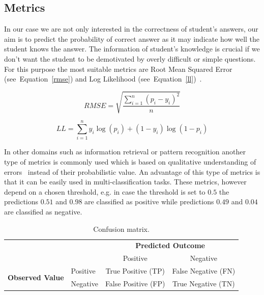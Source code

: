 \subsection{Metrics}

In our case we are not only interested in the correctness of student's answers, our aim is to predict the probability of correct answer as it may indicate how well the student knows the answer. The information of student's knowledge is crucial if we don't want the student to be demotivated by overly difficult or simple questions. For this purpose the most suitable metrics are Root Mean Squared Error (see~Equation~\ref{rmse}) and Log Likelihood (see~Equation~\ref{ll})~\cite{Pelanek2015a}.

\begin{equation} \label{rmse}
  RMSE = \sqrt{\frac{\sum_{i=1}^n (p_i - y_i)^2}{n}}
\end{equation}

\begin{equation} \label{ll}
  LL = \sum_{i=1}^n y_i \log(p_i) + (1 - y_i) \log(1 - p_i)
\end{equation}

In other domains such as information retrieval or pattern recognition another type of metrics is commonly used which is based on qualitative understanding of errors~\cite{Pelanek2015a} instead of their probabilistic value. An advantage of this type of metrics is that it can be easily used in multi-classification tasks. These metrics, however depend on a chosen threshold, e.g. in case the threshold is set to $0.5$ the predictions $0.51$ and $0.98$ are classified as positive while predictions $0.49$ and $0.04$ are classified as negative.

\begin{table}[htbp]
  \centering
  \caption{Confusion matrix.}
  \begin{tabular}{ l l c c }
   \toprule[\heavyrulewidth]
   & & \multicolumn{2}{c}{\textbf{Predicted Outcome}} \\
   & & Positive & Negative \\
   \midrule[\heavyrulewidth]
   \multirow{2}{5em}{\textbf{Observed Value}}
   & Positive & True Positive (TP) & False Negative (FN) \\
   & Negative & False Positive (FP) & True Negative (TN) \\
   \bottomrule[\heavyrulewidth]
  \end{tabular}
  \label{table:confusion-matrix}
\end{table}

